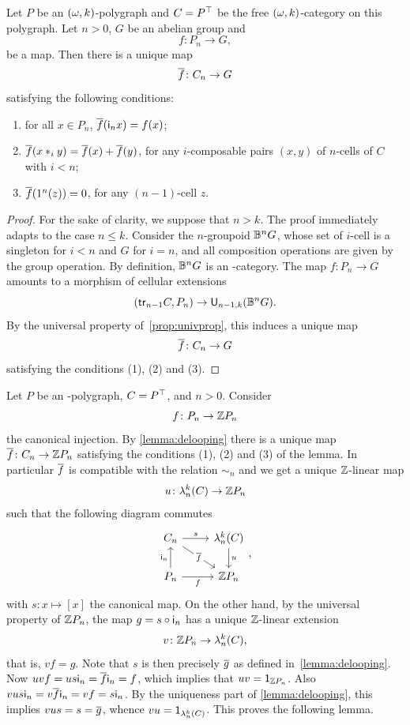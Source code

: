 \begin{lemma}\label{lemma:delooping}
  Let $P$ be an $(\omega,k)$\nbd-polygraph and $C=P^\top$ be the free $(\omega,k)$\nbd-category on this polygraph. Let $n > 0$, $G$ be an
  abelian group and 
  \[
    f \colon P_n \to G,
  \]
  be a map.
  Then there is a unique map
  \[\overline{f}\colon C_n\to G\]
 satisfying the following conditions:
 \begin{enumerate}
  \item  for all $x\in P_n$, $\overline{f}(\mathsf{i}_n x)=f(x)$;
  \item $\overline{f}(x \ast_{i} y)=\overline{f}(x)+\overline{f}(y)$, for any $i$\nbd-composable pairs 
    $(x,y)$ of $n$\nbd-cells of $C$ with $i<n$;
  \item $\overline{f}(1^{n}(z))=0$, for any $(n-1)$\nbd-cell $z$.
  \end{enumerate}
\end{lemma}
\begin{proof}
 For the sake of clarity, we suppose that $n>k$. The proof immediately
 adapts to the case $n\leq k$.
Consider the $n$\nbd-groupoid $\mathbb{B}^nG$,
whose set of $i$\nbd-cell is a singleton for $i<n$ and $G$ for $i=n$,
and all composition operations are given by the group
operation. By definition, $\mathbb{B}^nG$ is an -category. The map
$f\colon P_n\to G$ amounts to a morphism of cellular extensions
\[(\mathsf{tr}_{n-1}C,P_n)\to \mathsf{U}_{n-1,k}(\mathbb{B}^nG).\]
By the universal property of~\cref{prop:univprop}, this induces a
unique map
\[
  \overline{f}\colon C_n\to G
  \]
satisfying the conditions (1),
(2) and (3).  
\end{proof}
\begin{paragr}
  Let $P$ be an -polygraph, $C=P^\top$, and $n>0$. Consider
  \[f\colon P_n\to \mathbb Z P_n\]
  the canonical injection. By \cref{lemma:delooping} there is a unique
  map $\overline{f}\colon C_n\to \mathbb Z P_n$ satisfying the conditions (1),
  (2) and (3) of the lemma. In particular $\overline{f}$ is compatible with 
  the relation $\sim_n$ and we get a unique $\mathbb Z$-linear map
  \[u\colon \mathsf{\mathsf{\lambda}}^{k}_n(C)\to \mathbb Z P_n\]
  such that the following diagram commutes
  \[
    \begin{tikzcd}
      C_n \ar[rd,"\extend{f}"description]\ar[r,"s"]& \abelk{k}_n(C)\ar[d,"u"]\\
      P_n \ar[r,"f"'] \ar[u,"\geninc_n"]& \Z P_n
    \end{tikzcd},
  \]
  with $s:x\mapsto [x]$ the canonical map. On the other hand, by the
  universal property of $\mathbb Z P_n$, the map $g=s\circ\mathsf{i}_n$ has a unique
  $\mathbb Z$-linear extension
  \[v\colon \mathbb Z P_n\to\mathsf{\mathsf{\lambda}}^{k}_n(C),\]
  that is, $vf=g$. Note that $s$ is then precisely $\overline{g}$ as
  defined in~\cref{lemma:delooping}. Now $uvf=us\mathsf{i}_n=\overline{f}\mathsf{i}_n=f$, which implies that $uv=\mathsf{1}_{\mathbb Z P_n}$. Also
  $vus\mathsf{i}_n=v\overline{f}\mathsf{i}_n=vf=s\mathsf{i}_n$. By the uniqueness
  part of \cref{lemma:delooping}, this implies $vus=s=\overline{g}$,
  whence $vu=\mathsf{1}_{\mathsf{\mathsf{\lambda}}^{k}_n(C)}$. This proves the following lemma.
 \end{paragr}
